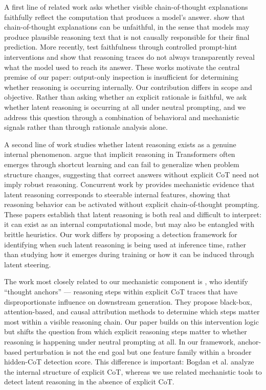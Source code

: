 \documentclass{article}
\theoremstyle{plain}
\theoremstyle{definition}
\theoremstyle{remark}
\begin{document}
A first line of related work asks whether visible chain-of-thought explanations faithfully reflect the computation that produces a model’s answer. \citet{turpin_language_2023} show that chain-of-thought explanations can be unfaithful, in the sense that models may produce plausible reasoning text that is not causally responsible for their final prediction. More recently, \citet{chen_reasoning_2025} test faithfulness through controlled prompt-hint interventions and show that reasoning traces do not always transparently reveal what the model used to reach its answer. These works motivate the central premise of our paper: output-only inspection is insufficient for determining whether reasoning is occurring internally. Our contribution differs in scope and objective. Rather than asking whether an explicit rationale is faithful, we ask whether latent reasoning is occurring at all under neutral prompting, and we address this question through a combination of behavioral and mechanistic signals rather than through rationale analysis alone.

A second line of work studies whether latent reasoning exists as a genuine internal phenomenon. \citet{lin_implicit_2025} argue that implicit reasoning in Transformers often emerges through shortcut learning and can fail to generalize when problem structure changes, suggesting that correct answers without explicit CoT need not imply robust reasoning. Concurrent work by \citet{he_reasoning_2026} provides mechanistic evidence that latent reasoning corresponds to steerable internal features, showing that reasoning behavior can be activated without explicit chain-of-thought prompting. These papers establish that latent reasoning is both real and difficult to interpret: it can exist as an internal computational mode, but may also be entangled with brittle heuristics. Our work differs by proposing a detection framework for identifying when such latent reasoning is being used at inference time, rather than studying how it emerges during training or how it can be induced through latent steering.

The work most closely related to our mechanistic component is \citet{bogdan_thought_2025}, who identify ``thought anchors'' --- reasoning steps within explicit CoT traces that have disproportionate influence on downstream generation. They propose black-box, attention-based, and causal attribution methods to determine which steps matter most within a visible reasoning chain. Our paper builds on this intervention logic but shifts the question from which explicit reasoning steps matter to whether reasoning is happening under neutral prompting at all. In our framework, anchor-based perturbation is not the end goal but one feature family within a broader hidden-CoT detection score. This difference is important: Bogdan et al. analyze the internal structure of explicit CoT, whereas we use related mechanistic tools to detect latent reasoning in the absence of explicit CoT.
\end{document}
